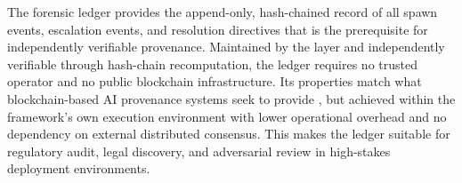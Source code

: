 The \bxthree{} forensic ledger provides the append-only, hash-chained record of all spawn events, escalation events, and resolution directives that is the prerequisite for independently verifiable provenance. Maintained by the \fact{} layer and independently verifiable through hash-chain recomputation, the ledger requires no trusted operator and no public blockchain infrastructure. Its properties match what blockchain-based AI provenance systems seek to provide \cite{on_chain_provenance_ai}, but achieved within the framework's own execution environment with lower operational overhead and no dependency on external distributed consensus. This makes the ledger suitable for regulatory audit, legal discovery, and adversarial review in high-stakes deployment environments.
